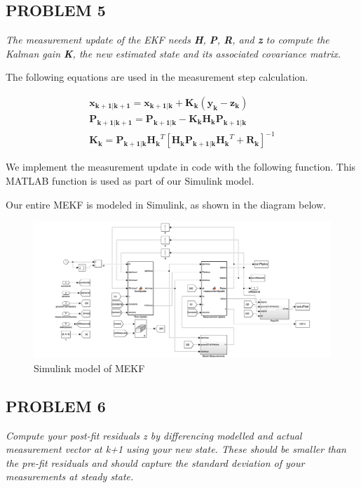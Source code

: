 \subsection{PROBLEM 5}
\textit{The measurement update of the EKF needs \textbf{H}, \textbf{P}, \textbf{R}, and \textbf{z} to compute the Kalman gain \textbf{K}, the new estimated state and its associated covariance matrix.}

The following equations are used in the measurement step calculation.

\begin{align*}
    \mathbf{x_{k+1 | k+1}} = \mathbf{x_{k+1 | k}} + \mathbf{K_k}
    (\mathbf{y_k} - \mathbf{z_k}) \\
    \mathbf{P_{k+1 | k+1}} = \mathbf{P_{k+1 | k}} - 
    \mathbf{K_k} \mathbf{H_k} \mathbf{P_{k+1 | k}} \\
    \mathbf{K_k} = \mathbf{P_{k+1 | k}} \mathbf{H_k}^T [\mathbf{H_k} \mathbf{P_{k+1 | k}} \mathbf{H_k}^T + \mathbf{R_k}]^{-1}
\end{align*}

We implement the measurement update in code with the following function. This MATLAB function is used as part of our Simulink model.



Our entire MEKF is modeled in Simulink, as shown in the diagram below.

\begin{figure}[H]
\centering
\includegraphics[scale=0.27]{Images/ps8_problem5_simulink.png}
\caption{Simulink model of MEKF}
\label{fig:ps8_problem5_simulink}
\end{figure}

\newpage
\subsection{PROBLEM 6}
\textit{Compute your post-fit residuals z by differencing modelled and actual measurement vector at k+1 using your new state. These should be smaller than the pre-fit residuals and should capture the standard deviation of your measurements at steady state.}

